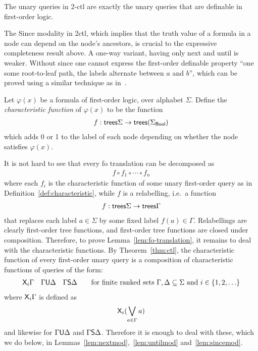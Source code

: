 \begin{theorem} \label{thm:ctl} The unary queries in 2-ctl are exactly the unary queries that are definable in first-order logic.
\end{theorem}

The Since modality in 2ctl, which implies that the truth value of a formula in a node can depend on the node's ancestors, is crucial to the  expressive completeness result above. A one-way variant, having only next and until is weaker. Without since one cannot express the first-order definable property ``one some root-to-leaf path, the labels alternate between $a$ and $b$'', which can be proved using a similar technique as in~\cite[Theorem 1]{bojanczyk2008common}. 
\begin{definition}\label{def:characteristic}
    Let $\varphi(x)$ be a formula of first-order logic, over alphabet $\Sigma$. Define the \emph{characteristic function} of $\varphi(x)$ to be the function
            \begin{align*}
                f : \mathsf {trees} \Sigma \to \mathsf {trees} (\Sigma_{\sf{Bool}})
            \end{align*}
            which adds 0 or 1 to  the label of each node depending on whether the node satisfies $\varphi(x)$.
\end{definition}


It is not hard to see that every fo translation can be decomposed as 
    \begin{align*}
        f \circ f_1 \circ \cdots \circ f_n
    \end{align*}
    where each $f_i$ is the characteristic function of some unary first-order query as in Definition~\ref{def:characteristic}, while $f$ is a relabelling, i.e.~a function
    \begin{align*}
        f : \mathsf {trees} \Sigma \to \mathsf {trees} \Gamma
    \end{align*}
    that replaces each label $a \in \Sigma$ by some fixed label  $f(a) \in \Gamma$. Relabellings are clearly first-order tree functions, and first-order tree functions are closed under composition. Therefore, to prove Lemma~\ref{lem:fo-translation}, it remains to deal with the characteristic functions. By Theorem~\ref{thm:ctl}, the characteristic function of every first-order unary query is a composition of characteristic functions of queries of the form:
    \begin{align*}
        \mathsf X_i \Gamma \quad \Gamma \mathsf U \Delta \quad \Gamma \mathsf S \Delta \qquad \text{for finite ranked sets $\Gamma,\Delta \subseteq \Sigma$ and $i \in \{1,2,\ldots\}$} 
    \end{align*}
    where $\mathsf X_i \Gamma$ is defined as 
    \begin{align*}
        \mathsf X_i (\bigvee_{a \in \Gamma} a) 
    \end{align*}
    and likewise for $\Gamma \mathsf U \Delta $ and $ \Gamma \mathsf S \Delta$. Therefore it is enough to  deal with these, which we do below, in Lemmas~\ref{lem:nextmod},~\ref{lem:untilmod} and~\ref{lem:sincemod}.



